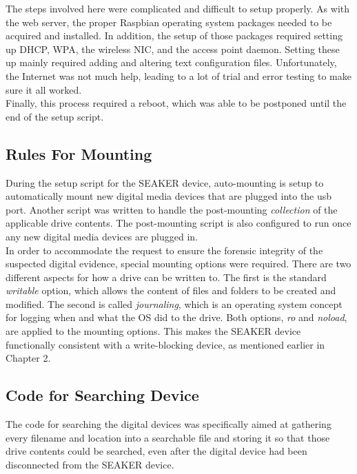 \documentclass[12pt]{article}
\begin{document}
The steps involved here were complicated and difficult to setup properly.  As
with the web server, the proper Raspbian operating system packages needed to be
acquired and installed.  In addition, the setup of those packages required 
setting up DHCP, WPA, the wireless NIC, and the access point daemon.  Setting
these up mainly required adding and altering text configuration files.  
Unfortunately, the Internet was not much help, leading to a lot of trial and 
error testing to make sure it all worked.\\

Finally, this process required a reboot, which was able to be postponed until
the end of the setup script.\\

\subsection{Rules For Mounting}

During the setup script for the SEAKER device, auto-mounting is setup to
automatically mount new digital media devices that are plugged into the \gls{usb}
port.  Another script was written to handle the post-mounting {\em collection}
of the applicable drive contents.  The post-mounting script is also
configured to run once any new digital media devices are plugged in.\\

In order to accommodate the request to ensure the forensic integrity of the
suspected digital evidence, special mounting options were required.  There
are two different aspects for how a drive can be written to.  The first is
the standard {\em writable} option, which allows the content of files and
folders to be created and modified.  The second is called {\em journaling},
which is an operating system concept for logging when and what the OS 
did to the drive.  Both options, {\em ro} and {\em noload}, are applied to
the mounting options.  This makes the SEAKER device functionally consistent
with a write-blocking device, as mentioned earlier in Chapter 2.\\

\subsection{Code for Searching Device}

The code for searching the digital devices was specifically aimed at gathering
every filename and location into a searchable file and storing it so that
those drive contents could be searched, even after the digital device had been
disconnected from the SEAKER device.\\
\end{document}
